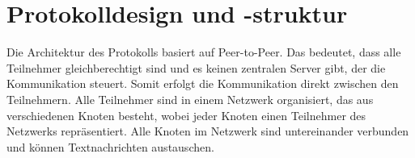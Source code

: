 \section{Protokolldesign und -struktur}
\label{sec:protokolldesign_und_struktur}


Die Architektur des Protokolls basiert auf Peer-to-Peer. Das bedeutet, dass
alle Teilnehmer gleichberechtigt sind und es keinen zentralen Server gibt, der
die Kommunikation steuert. Somit erfolgt die Kommunikation direkt zwischen den
Teilnehmern. Alle Teilnehmer sind in einem Netzwerk organisiert, das aus
verschiedenen Knoten besteht, wobei jeder Knoten einen Teilnehmer des Netzwerks repräsentiert.
Alle Knoten im Netzwerk sind untereinander verbunden und können Textnachrichten austauschen.









%



%

%

%




